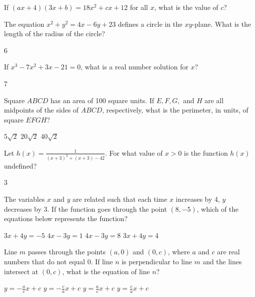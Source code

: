 \newpage



\question[1]
If $(a x + 4)(3 x + b) = 18 x^2 + c x + 12$ for all $x$, what is the value of $c$?
\begin{choices}
\end{choices}

\question[1]
The equation $x^2 + y^2 = 4x - 6y + 23$ defines a circle in the $xy$-plane. What is the length of the radius of the circle?
\begin{solution}
6
\end{solution}

\question[1]
If $x^3 - 7x^2 + 3x - 21 = 0$, what is a real number solution for $x$?
\begin{solution}
7
\end{solution}

\question[1]
Square $ABCD$ has an area of 100 square units. If $E, F, G,$ and $H$ are all midpoints of the sides of $ABCD$, respectively, what is the perimeter, in units, of square $EFGH$?
\begin{choices}
  \choice $5\sqrt{2}$
  \CorrectChoice $20\sqrt{2}$
  \choice $40\sqrt{2}$
\end{choices}



\newpage



\question[1]
Let $h(x) = \frac{1}{(x+3)^2 + (x+3) - 42}$. For what value of $x > 0$ is the function $h(x)$ undefined?
\begin{solution}
3
\end{solution}

\question[1]
The variables $x$ and $y$ are related such that each time $x$ increases by 4, $y$ decreases by 3. If the function goes through the point $(8, -5)$, which of the equations below represents the function?
\begin{choices}
  \choice $3x + 4y = -5$
  \choice $4x - 3y = 1$
  \choice $4x - 3y = 8$
  \CorrectChoice $3x + 4y = 4$
\end{choices}

\question[1]
Line $m$ passes through the points $(a, 0)$ and $(0, c)$, where $a$ and $c$ are real numbers that do not equal 0. If line $n$ is perpendicular to line $m$ and the lines intersect at $(0, c)$, what is the equation of line $n$?
\begin{choices}
  \choice $y = -\frac{a}{c}x + c$
  \choice $y = -\frac{c}{a}x + c$
  \CorrectChoice $y = \frac{a}{c}x + c$
  \choice $y = \frac{c}{a}x + c$
\end{choices}





